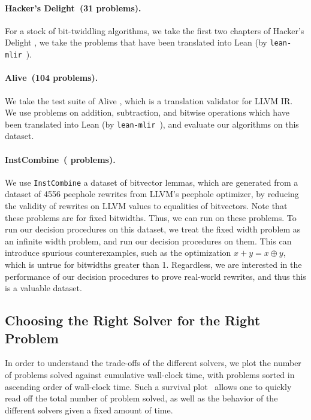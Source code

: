\noindent \paragraph{Hacker's Delight~(31 problems).}
For a stock of bit-twiddling algorithms, we take the first two chapters of Hacker's Delight \cite{warren2013hacker},
we take the problems that have been translated into Lean (by \texttt{lean-mlir}~\cite{leanmlir}).

\noindent \paragraph{Alive~(104 problems).} We take the test suite of Alive \cite{lopes2015provably}, which is a translation validator for LLVM IR.
We use problems on addition, subtraction, and bitwise operations which have been translated into Lean (by \texttt{lean-mlir}~\cite{leanmlir}),
and evaluate our algorithms on this dataset.
\noindent \paragraph{InstCombine~(\InstCombineTotalProblems{} problems).}
We use \texttt{InstCombine} a dataset of \InstCombineTotalProblems{} bitvector
lemmas, which are
generated from a dataset of 4556 peephole rewrites from LLVM's peephole optimizer, by
reducing the validity of rewrites on LLVM values to equalities of bitvectors.
%
Note that these problems are for fixed bitwidths.
%
Thus, we can run \bvdecide{} on these problems. To run our decision procedures on this dataset,
we treat the fixed width problem as an infinite width problem, and run our decision procedures on them.
This can introduce spurious counterexamples, such as the optimization $x + y = x \oplus y$, which is untrue for bitwidths greater than 1.
Regardless, we are interested in the performance of our decision procedures to prove real-world rewrites,
and thus this is a valuable dataset.

\subsection{Choosing the Right Solver for the Right Problem}
\label{sec:swbv:right-solver}

In order to understand the trade-offs of the different solvers,
we plot the number of problems solved against cumulative wall-clock time,
with problems sorted in ascending order of wall-clock time.
Such a survival plot~\cite{brain2017benchmarking} allows one to quickly read off the total number of problem solved,
as well as the behavior of the different solvers given a fixed amount of time.

